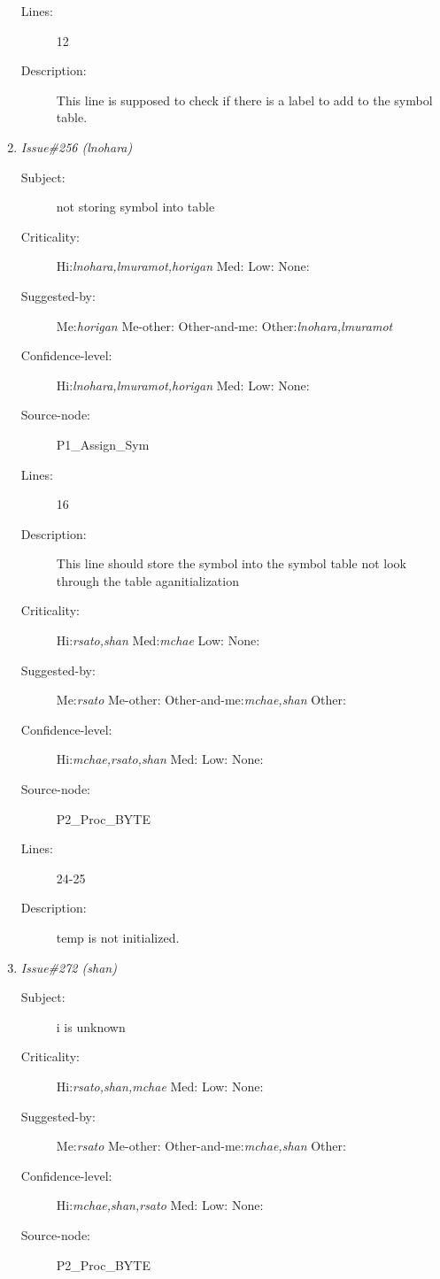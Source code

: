 \begin{enumerate}
\begin{description}
\item [Lines:] 12

\item [Description:] This line is supposed to check if there is a
label to add to the symbol table.
\end{description}
\item {\it Issue\#256 (lnohara)}
\begin{description}
\item [Subject:] not storing symbol into table
\item [Criticality:] Hi:{\it lnohara,lmuramot,horigan} Med:{\it } Low:{\it } None:{\it }
\item [Suggested-by:] Me:{\it horigan} Me-other:{\it } Other-and-me:{\it } Other:{\it lnohara,lmuramot}
\item [Confidence-level:] Hi:{\it lnohara,lmuramot,horigan} Med:{\it } Low:{\it } None:{\it }
\item [Source-node:] P1\_Assign\_Sym

\item [Lines:] 16

\item [Description:] This line should store the symbol into the
symbol table not look through the table aganitialization
\item [Criticality:] Hi:{\it rsato,shan} Med:{\it mchae} Low:{\it } None:{\it }
\item [Suggested-by:] Me:{\it rsato} Me-other:{\it } Other-and-me:{\it mchae,shan} Other:{\it }
\item [Confidence-level:] Hi:{\it mchae,rsato,shan} Med:{\it } Low:{\it } None:{\it }
\item [Source-node:] P2\_Proc\_BYTE

\item [Lines:] 24-25

\item [Description:] temp is not initialized.
\end{description}
\item {\it Issue\#272 (shan)}
\begin{description}
\item [Subject:] i is unknown
\item [Criticality:] Hi:{\it rsato,shan,mchae} Med:{\it } Low:{\it } None:{\it }
\item [Suggested-by:] Me:{\it rsato} Me-other:{\it } Other-and-me:{\it mchae,shan} Other:{\it }
\item [Confidence-level:] Hi:{\it mchae,shan,rsato} Med:{\it } Low:{\it } None:{\it }
\item [Source-node:] P2\_Proc\_BYTE


\end{description}
\end{enumerate}

